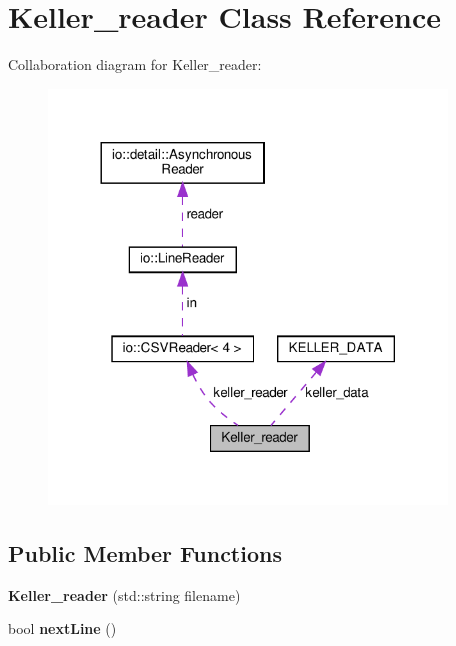 \hypertarget{classKeller__reader}{}\section{Keller\+\_\+reader Class Reference}
\label{classKeller__reader}


Collaboration diagram for Keller\+\_\+reader\+:\nopagebreak
\begin{figure}[H]
\begin{center}
\leavevmode
\includegraphics[width=300pt]{classKeller__reader__coll__graph}
\end{center}
\end{figure}
\subsection*{Public Member Functions}
\begin{DoxyCompactItemize}
\item 
\mbox{\label{classKeller__reader_af02af436842fe2678d6589c3f1b146db}} 
{\bfseries Keller\+\_\+reader} (std\+::string filename)
\item 
\mbox{\label{classKeller__reader_ab77d4a9f47de55c6b8d891f08d662785}} 
bool {\bfseries next\+Line} ()
\end{DoxyCompactItemize}
